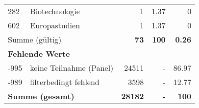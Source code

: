 \begin{longtable}{lXrrr}
        282 & \multicolumn{1}{X}{Biotechnologie} & %
          \num{1} &
          \num[round-mode=places,round-precision=2]{1.37} &
          \num[round-mode=places,round-precision=2]{0} \\

        602 & \multicolumn{1}{X}{Europastudien} & %
          \num{1} &
          \num[round-mode=places,round-precision=2]{1.37} &
          \num[round-mode=places,round-precision=2]{0} \\

     \midrule
     \multicolumn{2}{l}{Summe (gültig)} &
       \textbf{\num{73}} &
     \textbf{100} &
       \textbf{\num[round-mode=places,round-precision=2]{0.26}} \\
     \multicolumn{5}{l}{\textbf{Fehlende Werte}}\\
       -995 &
       keine Teilnahme (Panel) &
         \num{24511} &
        - &
         \num[round-mode=places,round-precision=2]{86.97} \\
       -989 &
       filterbedingt fehlend &
         \num{3598} &
        - &
         \num[round-mode=places,round-precision=2]{12.77} \\
     \midrule
     \multicolumn{2}{l}{\textbf{Summe (gesamt)}} &
          \textbf{\num{28182}} &
        \textbf{-} &
        \textbf{100} \\
     \bottomrule
     \end{longtable}
     
